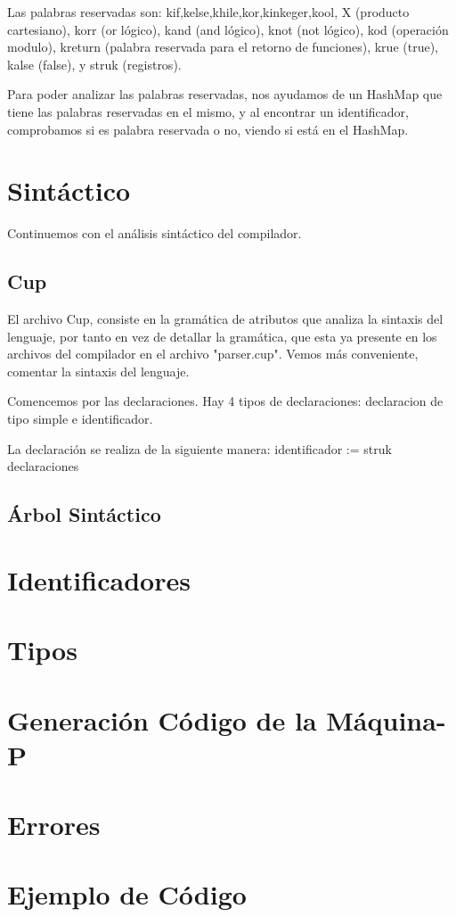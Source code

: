 \documentclass[a4paper, 11pt, twoside, openany, onecolumn, final]{memoir}
\begin{document}
	Las palabras reservadas son: kif,kelse,khile,kor,kinkeger,kool, X (producto cartesiano), korr (or lógico), kand (and lógico), knot (not lógico), kod (operación modulo), kreturn (palabra reservada para el retorno de funciones), krue (true), kalse (false), y struk (registros).
	
	Para poder analizar las palabras reservadas, nos ayudamos de un HashMap que tiene las palabras reservadas en el mismo, y al encontrar un identificador, comprobamos si es palabra reservada o no, viendo si está en el HashMap.
	
	\section{Sintáctico}
	Continuemos con el análisis sintáctico del compilador.
	\subsection{Cup}
	El archivo Cup, consiste en la gramática de atributos que analiza la sintaxis del lenguaje, por tanto en vez de detallar la gramática, que esta ya presente en los archivos del compilador en el archivo "parser.cup". Vemos más conveniente, comentar la sintaxis del lenguaje.
	
	Comencemos por las declaraciones. Hay 4 tipos de declaraciones: declaracion de tipo simple e identificador.
	
	La declaración se realiza de la siguiente manera: identificador := struk { declaraciones }
	\subsection{Árbol Sintáctico}
	 \section{Identificadores}
	 \section{Tipos}
	 \section{Generación Código de la Máquina-P}
	 \section{Errores}
	 \section{Ejemplo de Código}
	 
\end{document}
